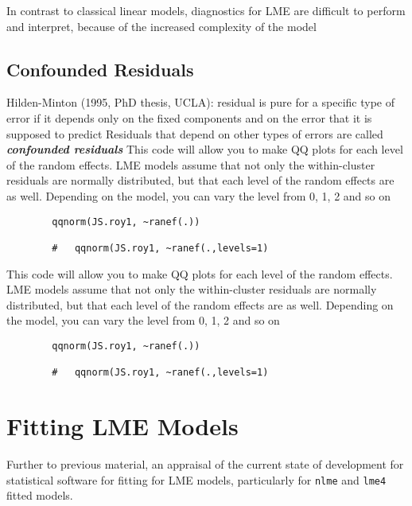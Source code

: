 \documentclass[12pt, a4paper]{report}
\theoremstyle{plain}
\theoremstyle{definition}
\theoremstyle{remark}
\begin{document}
	In contrast to classical linear models, diagnostics for LME are
	difficult to perform and interpret, because of the increased
	complexity of the model
	
	\section{Confounded Residuals}
	Hilden-Minton (1995, PhD thesis, UCLA): residual is pure for a specific type of error if it depends only on the fixed components and
	on the error that it is supposed to predict	Residuals that depend on other types of errors are called \textit{\textbf{confounded
			residuals}}
	This code will allow you to make QQ plots for each level of the random effects.  LME models assume that not only the within-cluster residuals are normally distributed, but that each level of the random effects are as well. Depending on the model, you can vary the level from 0, 1, 2 and so on
	\begin{framed}
		\begin{verbatim}
		qqnorm(JS.roy1, ~ranef(.))
		
		# 	qqnorm(JS.roy1, ~ranef(.,levels=1)
		\end{verbatim}
	\end{framed}
	This code will allow you to make QQ plots for each level of the random effects.  LME models assume that not only the within-cluster residuals are normally distributed, but that each level of the random effects are as well. Depending on the model, you can vary the level from 0, 1, 2 and so on
	\begin{framed}
		\begin{verbatim}
		qqnorm(JS.roy1, ~ranef(.))
		
		# 	qqnorm(JS.roy1, ~ranef(.,levels=1)
		\end{verbatim}
	\end{framed}

	

	\chapter{Fitting LME Models}
	Further to previous material, an appraisal of the current state of development for statistical software for fitting for LME models, particularly for \texttt{nlme} and \texttt{lme4} fitted models.
	
\end{document}
